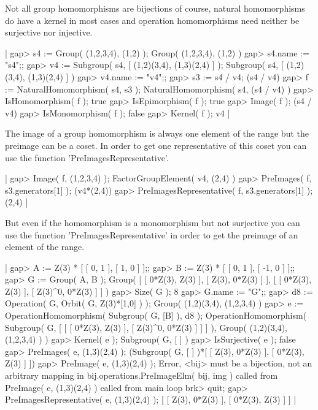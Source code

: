 Not  all  group   homomorphisms   are   bijections   of  course,  natural
homomorphisms do have a kernel in  most cases and operation homomorphisms
need neither be surjective nor injective.

|    gap> s4 := Group( (1,2,3,4), (1,2) );
    Group( (1,2,3,4), (1,2) )
    gap> s4.name := "s4";;
    gap> v4 := Subgroup( s4, [ (1,2)(3,4), (1,3)(2,4) ] );
    Subgroup( s4, [ (1,2)(3,4), (1,3)(2,4) ] )
    gap> v4.name := "v4";;
    gap> s3 := s4 / v4;
    (s4 / v4)
    gap> f := NaturalHomomorphism( s4, s3 );
    NaturalHomomorphism( s4, (s4 / v4) )
    gap> IsHomomorphism( f );
    true
    gap> IsEpimorphism( f );
    true
    gap> Image( f );
    (s4 / v4)
    gap> IsMonomorphism( f );
    false
    gap> Kernel( f );
    v4 |

The image of a group homomorphism is always one element of the range  but
the preimage can be a coset.  In order to  get one representative of this
coset you can use the function 'PreImagesRepresentative'.

|    gap> Image( f, (1,2,3,4) );
    FactorGroupElement( v4, (2,4) )
    gap> PreImages( f, s3.generators[1] );
    (v4*(2,4))
    gap> PreImagesRepresentative( f, s3.generators[1] );
    (2,4) |

But even if the homomorphism is a monomorphism but not surjective you can
use the  function 'PreImagesRepresentative' in  order to get the preimage
of an element of the range.

|    gap> A := Z(3) * [ [ 0, 1 ], [ 1, 0 ] ];;
    gap> B := Z(3) * [ [ 0, 1 ], [ -1, 0 ] ];;
    gap> G := Group( A, B );
    Group( [ [ 0*Z(3), Z(3) ], [ Z(3), 0*Z(3) ] ],
    [ [ 0*Z(3), Z(3) ], [ Z(3)^0, 0*Z(3) ] ] )
    gap> Size( G );
    8
    gap> G.name := "G";;
    gap> d8 := Operation( G, Orbit( G, Z(3)*[1,0] ) );
    Group( (1,2)(3,4), (1,2,3,4) )
    gap> e := OperationHomomorphism( Subgroup( G, [B] ), d8 );
    OperationHomomorphism( Subgroup( G,
    [ [ [ 0*Z(3), Z(3) ], [ Z(3)^0, 0*Z(3) ] ] ] ), Group( (1,2)(3,4),
    (1,2,3,4) ) )
    gap> Kernel( e );
    Subgroup( G, [  ] )
    gap> IsSurjective( e );
    false
    gap> PreImages( e, (1,3)(2,4) );
    (Subgroup( G, [  ] )*[ [ Z(3), 0*Z(3) ], [ 0*Z(3), Z(3) ] ])
    gap> PreImage( e, (1,3)(2,4) );
    Error, <bij> must be a bijection, not an arbitrary mapping in
    bij.operations.PreImageElm( bij, img ) called from
    PreImage( e, (1,3)(2,4) ) called from
    main loop
    brk> quit;
    gap> PreImagesRepresentative( e, (1,3)(2,4) );
    [ [ Z(3), 0*Z(3) ], [ 0*Z(3), Z(3) ] ] |

